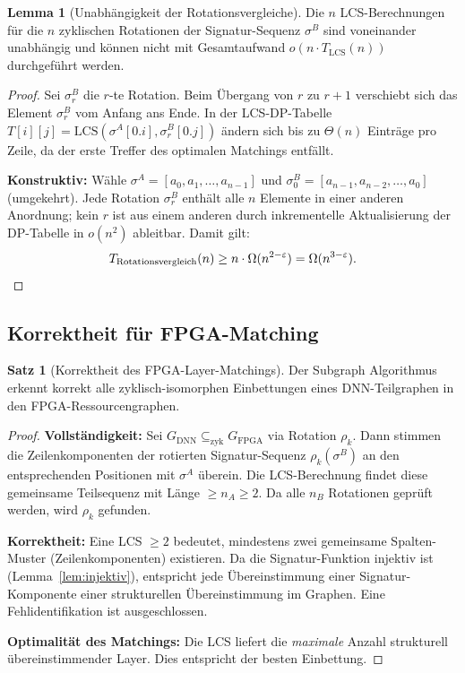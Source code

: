 ﻿\documentclass[a4paper,12pt]{article}
\theoremstyle{definition}
\newtheorem{satz}{Satz}
\newtheorem{lemma}{Lemma}
\begin{document}
\begin{lemma}[Unabhängigkeit der Rotationsvergleiche]
\label{lem:rotation_independent}
    Die $n$ LCS-Berechnungen für die $n$ zyklischen Rotationen der Signatur-Sequenz $\sigma^B$
    sind voneinander unabhängig und können nicht mit Gesamtaufwand $o(n \cdot T_{\text{LCS}}(n))$
    durchgeführt werden.
\end{lemma}

\begin{proof}
    Sei $\sigma^B_r$ die $r$-te Rotation. Beim Übergang von $r$ zu $r+1$ verschiebt sich
    das Element $\sigma_r^B$ vom Anfang ans Ende. In der LCS-DP-Tabelle
    $T[i][j] = \text{LCS}(\sigma^A[0.i], \sigma^B_r[0.j])$ ändern sich bis zu $\Theta(n)$
    Einträge pro Zeile, da der erste Treffer des optimalen Matchings entfällt.
    
    \textbf{Konstruktiv:} Wähle $\sigma^A = [a_0, a_1, \ldots, a_{n-1}]$ und
    $\sigma^B_0 = [a_{n-1}, a_{n-2}, \ldots, a_0]$ (umgekehrt). Jede Rotation $\sigma^B_r$
    enthält alle $n$ Elemente in einer anderen Anordnung; kein $r$ ist aus einem anderen
    durch inkrementelle Aktualisierung der DP-Tabelle in $o(n^2)$ ableitbar.
    Damit gilt:
    \[
        T_{\text{Rotationsvergleich}}(n) \geq n \cdot \Omega(n^{2-\varepsilon}) = \Omega(n^{3-\varepsilon}). \qedhere
    \]
\end{proof}

\subsection{Korrektheit für FPGA-Matching}

\begin{satz}[Korrektheit des FPGA-Layer-Matchings]
\label{satz:korrektheit}
    Der Subgraph Algorithmus erkennt korrekt alle zyklisch-isomorphen Einbettungen
    eines DNN-Teilgraphen in den FPGA-Ressourcengraphen.
\end{satz}

\begin{proof}
    \textbf{Vollständigkeit:} Sei $G_{\text{DNN}} \subseteq_{\text{zyk}} G_{\text{FPGA}}$
    via Rotation $\rho_k$. Dann stimmen die Zeilenkomponenten der rotierten Signatur-Sequenz
    $\rho_k(\sigma^B)$ an den entsprechenden Positionen mit $\sigma^A$ überein.
    Die LCS-Berechnung findet diese gemeinsame Teilsequenz mit Länge $\geq n_A \geq 2$.
    Da alle $n_B$ Rotationen geprüft werden, wird $\rho_k$ gefunden.
    
    \textbf{Korrektheit:} Eine LCS $\geq 2$ bedeutet, mindestens zwei gemeinsame Spalten-Muster
    (Zeilenkomponenten) existieren. Da die Signatur-Funktion injektiv ist (Lemma~\ref{lem:injektiv}),
    entspricht jede Übereinstimmung einer Signatur-Komponente einer strukturellen Übereinstimmung
    im Graphen. Eine Fehlidentifikation ist ausgeschlossen.
    
    \textbf{Optimalität des Matchings:} Die LCS liefert die \emph{maximale} Anzahl
    strukturell übereinstimmender Layer. Dies entspricht der besten Einbettung. \qedhere
\end{proof}
\end{document}
